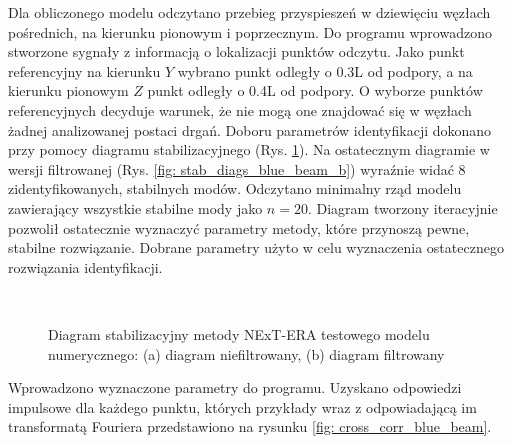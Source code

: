 Dla obliczonego modelu odczytano przebieg przyspieszeń w dziewięciu węzłach pośrednich, na kierunku pionowym i poprzecznym. Do programu wprowadzono stworzone sygnały z informacją o lokalizacji punktów odczytu. Jako punkt referencyjny na kierunku $Y$ wybrano punkt odległy o 0.3L od podpory, a na kierunku pionowym $Z$ punkt odległy o 0.4L od podpory. O wyborze punktów referencyjnych decyduje warunek, że nie mogą one znajdować się w węzłach żadnej analizowanej postaci drgań. Doboru parametrów identyfikacji dokonano przy pomocy diagramu stabilizacyjnego (Rys. \ref{fig: stab_diags_blue_beam}). Na ostatecznym diagramie w wersji filtrowanej (Rys. \ref{fig: stab_diags_blue_beam_b}) wyraźnie widać 8 zidentyfikowanych, stabilnych modów. Odczytano minimalny rząd modelu zawierający wszystkie stabilne mody jako $n=20$. Diagram tworzony iteracyjnie pozwolił ostatecznie wyznaczyć parametry metody, które przynoszą pewne, stabilne rozwiązanie. Dobrane parametry użyto w celu wyznaczenia ostatecznego rozwiązania identyfikacji.

\begin{figure}[ht]
	\centering
	\\
	\captionsetup{justification=centering}
	\caption{Diagram stabilizacyjny metody NExT-ERA testowego modelu numerycznego: (a) diagram niefiltrowany, (b) diagram filtrowany}
	\label{fig: stab_diags_blue_beam}
\end{figure}

Wprowadzono wyznaczone parametry do programu. Uzyskano odpowiedzi impulsowe dla każdego punktu, których przykłady wraz z odpowiadającą im transformatą Fouriera przedstawiono na rysunku \ref{fig: cross_corr_blue_beam}. 


